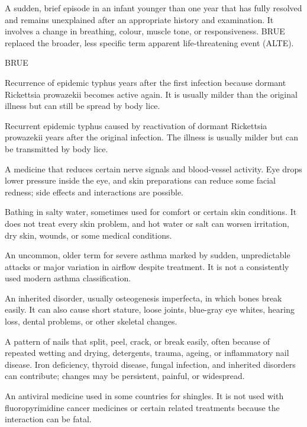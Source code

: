  A sudden, brief episode in an
infant younger than one year that has fully resolved and remains unexplained
after an appropriate history and examination. It involves a change in breathing,
colour, muscle tone, or responsiveness. BRUE replaced the broader, less specific
term apparent life-threatening event (ALTE).

\synonyms
BRUE

 Recurrence of epidemic typhus years after the first infection because dormant Rickettsia prowazekii becomes active again. It is usually milder than the original illness but can still be spread by body lice.

 Recurrent epidemic typhus caused by reactivation of dormant Rickettsia prowazekii years after the original infection. The illness is usually milder but can be transmitted by body lice.

 A medicine that reduces certain nerve signals and blood-vessel activity. Eye drops lower pressure inside the eye, and skin preparations can reduce some facial redness; side effects and interactions are possible.

 Bathing in salty water, sometimes used for comfort or certain skin conditions. It does not treat every skin problem, and hot water or salt can worsen irritation, dry skin, wounds, or some medical conditions.

 An uncommon, older term for severe asthma marked by
sudden, unpredictable attacks or major variation in airflow despite treatment.
It is not a consistently used modern asthma classification.

 An inherited disorder, usually osteogenesis imperfecta, in which bones break easily. It can also cause short stature, loose joints, blue-gray eye whites, hearing loss, dental problems, or other skeletal changes.

 A pattern of nails that split, peel, crack, or break easily, often because of repeated wetting and drying, detergents, trauma, ageing, or inflammatory nail disease. Iron deficiency, thyroid disease, fungal infection, and inherited disorders can contribute; changes may be persistent, painful, or widespread.

 An antiviral medicine used in some countries for shingles. It is not used with fluoropyrimidine cancer medicines or certain related treatments because the interaction can be fatal.

